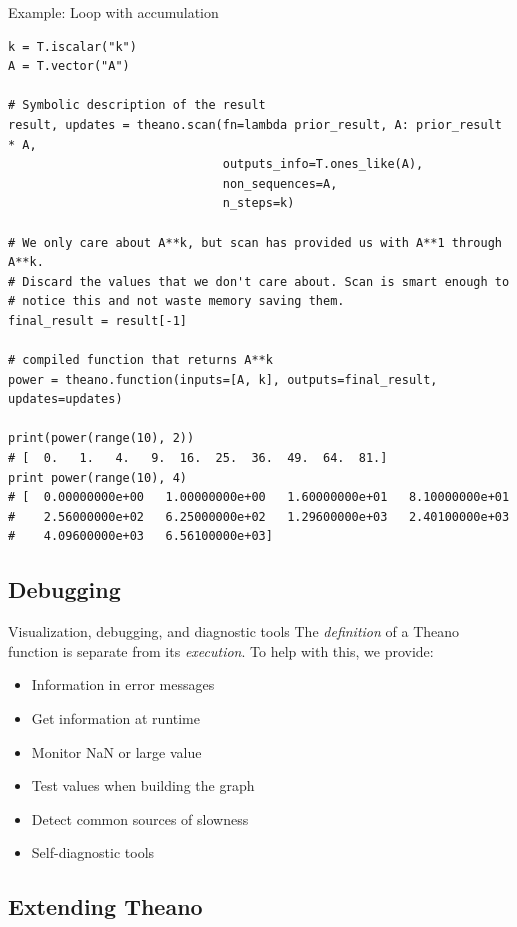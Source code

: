 \documentclass[a4paper,9pt]{beamer}
\begin{document}
\begin{frame}[fragile]{Example: Loop with accumulation}
  \footnotesize
    \begin{verbatim}
k = T.iscalar("k")
A = T.vector("A")

# Symbolic description of the result
result, updates = theano.scan(fn=lambda prior_result, A: prior_result * A,
                              outputs_info=T.ones_like(A),
                              non_sequences=A,
                              n_steps=k)

# We only care about A**k, but scan has provided us with A**1 through A**k.
# Discard the values that we don't care about. Scan is smart enough to
# notice this and not waste memory saving them.
final_result = result[-1]

# compiled function that returns A**k
power = theano.function(inputs=[A, k], outputs=final_result, updates=updates)

print(power(range(10), 2))
# [  0.   1.   4.   9.  16.  25.  36.  49.  64.  81.]
print power(range(10), 4)
# [  0.00000000e+00   1.00000000e+00   1.60000000e+01   8.10000000e+01
#    2.56000000e+02   6.25000000e+02   1.29600000e+03   2.40100000e+03
#    4.09600000e+03   6.56100000e+03]
  \end{verbatim}
\end{frame}

\subsection{Debugging}
\begin{frame}[fragile]{Visualization, debugging, and diagnostic tools}
  The \emph{definition} of a Theano function is separate from its \emph{execution}.
  To help with this, we provide:
  \begin{itemize}
    \item Information in error messages
    \item Get information at runtime
    \item Monitor NaN or large value
    \item Test values when building the graph
    \item Detect common sources of slowness
    \item Self-diagnostic tools
  \end{itemize}
\end{frame}

\subsection{Extending Theano}
\end{document}
